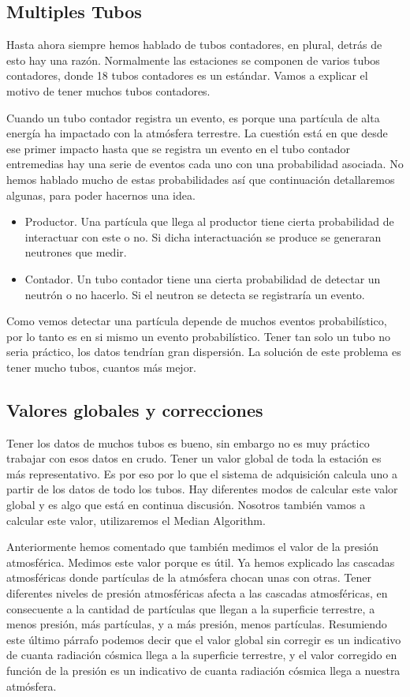 	\subsection{Multiples Tubos}
		Hasta ahora siempre hemos hablado de tubos contadores, en plural, detrás de esto hay una razón. Normalmente las estaciones se componen de
		varios tubos contadores, donde 18 tubos contadores es un estándar. Vamos a explicar el motivo de tener muchos tubos contadores. 
		\par
		Cuando un tubo contador registra un evento, es porque una partícula de alta energía ha impactado con la atmósfera terrestre. La cuestión está
		en que desde ese primer impacto hasta que se registra un evento en el tubo contador entremedias hay una serie de eventos cada uno con una
		probabilidad asociada. No hemos hablado mucho de estas probabilidades así que continuación detallaremos algunas, para poder hacernos una idea. 
		\begin{itemize}
			\item Productor. 	Una partícula que llega al productor tiene cierta probabilidad de interactuar con este o no. Si dicha
			  			interactuación se produce se generaran neutrones que medir.
			\item Contador. 	Un tubo contador tiene una cierta probabilidad de detectar un neutrón o no hacerlo. Si el neutron se detecta
			  			se registraría un evento.
		\end{itemize}
		Como vemos detectar una partícula depende de muchos eventos probabilístico, por lo tanto es en si mismo un evento probabilístico. Tener tan
		solo un tubo no seria práctico, los datos tendrían gran dispersión. La solución de este problema es tener mucho tubos, cuantos más mejor.
	\subsection{Valores globales y correcciones}
		Tener los datos de muchos tubos es bueno, sin embargo no es muy práctico trabajar con esos datos en crudo. Tener un valor global de toda la
		estación es más representativo. Es por eso por lo que el sistema de adquisición calcula uno a partir de los datos de todo los tubos. Hay 
		diferentes modos de calcular este valor global y es algo que está en continua discusión. Nosotros también vamos a calcular este valor, 
		utilizaremos el Median Algorithm\cite{MedianAlgr}.
		\par
		Anteriormente hemos comentado que también medimos el valor de la presión atmosférica. Medimos este valor porque es útil. Ya hemos explicado
		las cascadas atmosféricas donde partículas de la atmósfera chocan unas con otras. Tener diferentes niveles de presión atmosféricas afecta a
		las cascadas atmosféricas, en consecuente a la cantidad de partículas que llegan a la superficie terrestre, a menos presión, más partículas,
		y a más presión, menos partículas. Resumiendo este último párrafo  podemos decir que el valor global sin corregir es un indicativo de cuanta
		radiación cósmica llega a la superficie terrestre, y el valor corregido en función de la presión es un indicativo de cuanta radiación cósmica
		llega a nuestra atmósfera.
